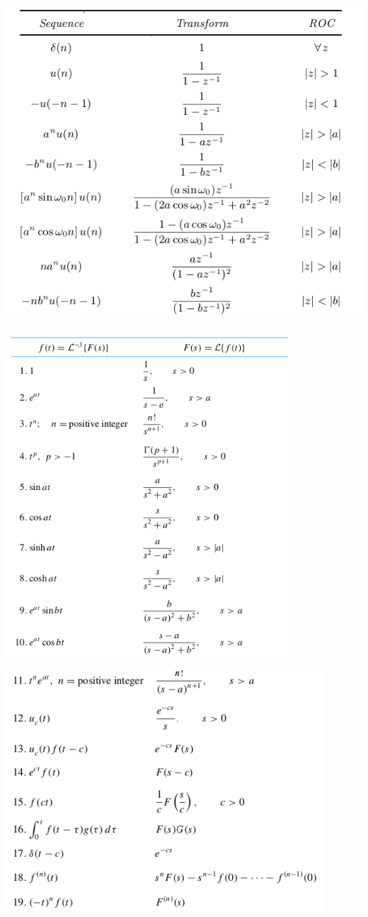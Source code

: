 \documentclass[12pt,fleqn]{article}\usepackage{../../common}
\begin{document}
\includegraphics[height=12cm]{z_01.png}

\includegraphics[height=12cm]{lap_1.png}

\includegraphics[height=9cm]{lap_2.png}
\end{document}
